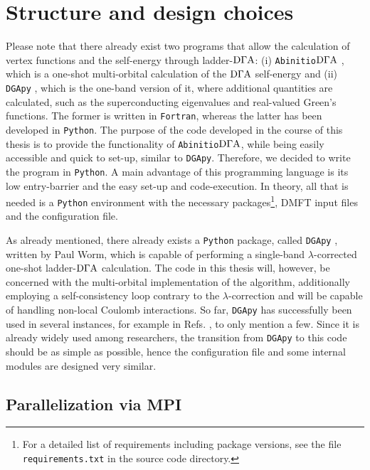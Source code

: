 \documentclass[../../main.tex]{subfiles}
\begin{document}
\section{Structure and design choices}

Please note that there already exist two programs that allow the calculation of vertex functions and the self-energy through ladder-$\text{D}\Gamma\text{A}$: (i) \texttt{Abinitio$\text{D}\Gamma\text{A}$} \cite{Galler2019, Galler2018, Galler2017}, which is a one-shot multi-orbital calculation of the $\text{D}\Gamma\text{A}$ self-energy and (ii) \texttt{DGApy} \cite{Worm2023}, which is the one-band version of it, where additional quantities are calculated, such as the superconducting eigenvalues and real-valued Green's functions. The former is written in \texttt{Fortran}, whereas the latter has been developed in \texttt{Python}.
The purpose of the code developed in the course of this thesis is to provide the functionality of \texttt{Abinitio$\text{D}\Gamma\text{A}$}, while being easily accessible and quick to set-up, similar to \texttt{DGApy}. Therefore, we decided to write the program in \texttt{Python}. A main advantage of this programming language is its low entry-barrier and the easy set-up and code-execution. In theory, all that is needed is a \texttt{Python} environment with the necessary packages\footnote{For a detailed list of requirements including package versions, see the file \texttt{requirements.txt} in the source code directory.}, DMFT input files and the configuration file.

As already mentioned, there already exists a \texttt{Python} package, called \texttt{DGApy} \cite{Worm2023}, written by Paul Worm, which is capable of performing a single-band $\lambda$-corrected one-shot ladder-$\text{D}\Gamma\text{A}$ calculation. The code in this thesis will, however, be concerned with the multi-orbital implementation of the algorithm, additionally employing a self-consistency loop contrary to the $\lambda$-correction and will be capable of handling non-local Coulomb interactions. So far, \texttt{DGApy} has successfully been used in several instances, for example in Refs. \cite{DiCataldo2024, Worm2024}, to only mention a few. Since it is already widely used among researchers, the transition from \texttt{DGApy} to this code should be as simple as possible, hence the configuration file and some internal modules are designed very similar.

\subsection{Parallelization via MPI}
\end{document}

